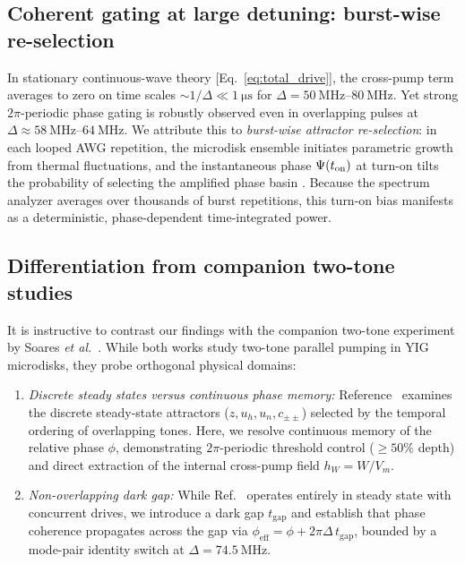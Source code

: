 \documentclass[aps,prb,reprint,superscriptaddress,floatfix]{revtex4-2}
\newcommand{\tgap}{t_{\mathrm{gap}}}
\begin{document}
\subsection{Coherent gating at large detuning: burst-wise re-selection}\label{sec:disc_burst}

In stationary continuous-wave theory [Eq.~\eqref{eq:total_drive}], the cross-pump term averages to zero on time scales $\sim 1/\Delta \ll \SI{1}{\micro\second}$ for $\Delta=\SIrange{50}{80}{\mega\hertz}$. Yet strong $2\pi$-periodic phase gating is robustly observed even in overlapping pulses at $\Delta\approx\SIrange{58}{64}{\mega\hertz}$. We attribute this to \emph{burst-wise attractor re-selection}: in each looped AWG repetition, the microdisk ensemble initiates parametric growth from thermal fluctuations, and the instantaneous phase $\Psi(t_{\rm on})$ at turn-on tilts the probability of selecting the amplified phase basin \cite{elyasi22,zautkin83}. Because the spectrum analyzer averages over thousands of burst repetitions, this turn-on bias manifests as a deterministic, phase-dependent time-integrated power.

\subsection{Differentiation from companion two-tone studies}\label{sec:disc_soares}

It is instructive to contrast our findings with the companion two-tone experiment by Soares \textit{et al.}\ \cite{soares26}. While both works study two-tone parallel pumping in YIG microdisks, they probe orthogonal physical domains:
\begin{enumerate}
\item \emph{Discrete steady states versus continuous phase memory:} Reference~\cite{soares26} examines the discrete steady-state attractors ($z, u_h, u_n, c_{\pm\pm}$) selected by the temporal ordering of overlapping tones. Here, we resolve continuous memory of the relative phase $\phi$, demonstrating $2\pi$-periodic threshold control ($\ge 50\%$ depth) and direct extraction of the internal cross-pump field $h_W=W/V_m$.
\item \emph{Non-overlapping dark gap:} While Ref.~\cite{soares26} operates entirely in steady state with concurrent drives, we introduce a dark gap $\tgap$ and establish that phase coherence propagates across the gap via $\phi_{\mathrm{eff}}=\phi+2\pi\Delta\,\tgap$, bounded by a mode-pair identity switch at $\Delta=\SI{74.5}{\mega\hertz}$.
\end{enumerate}
\end{document}

